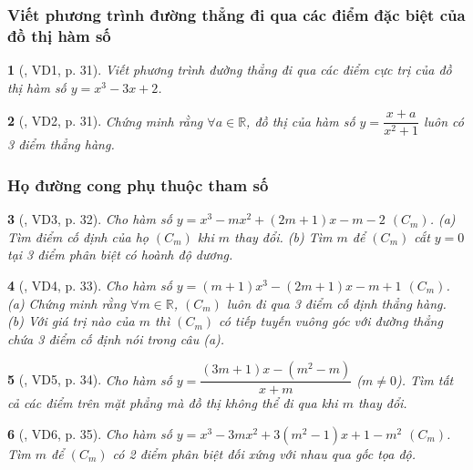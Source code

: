 \documentclass{article}
\newtheorem{baitoan}{}
\begin{document}
\subsubsection{Viết phương trình đường thẳng đi qua các điểm đặc biệt của đồ thị hàm số}

\begin{baitoan}[\cite{TLCT_giai_tich_12}, VD1, p. 31]
	Viết phương trình đường thẳng đi qua các điểm cực trị của đồ thị hàm số $y = x^3 - 3x + 2$.
\end{baitoan}

\begin{baitoan}[\cite{TLCT_giai_tich_12}, VD2, p. 31]
	Chứng minh rằng $\forall a\in\mathbb{R}$, đồ thị của hàm số $y = \dfrac{x + a}{x^2 + 1}$ luôn có 3 điểm thẳng hàng.
\end{baitoan}

\subsubsection{Họ đường cong phụ thuộc tham số}

\begin{baitoan}[\cite{TLCT_giai_tich_12}, VD3, p. 32]
	Cho hàm số $y = x^3 - mx^2 + (2m + 1)x - m - 2$ $(C_m)$. (a) Tìm điểm cố định của họ $(C_m)$ khi $m$ thay đổi. (b) Tìm $m$ để $(C_m)$ cắt $y = 0$ tại 3 điểm phân biệt có hoành độ dương.	
\end{baitoan}

\begin{baitoan}[\cite{TLCT_giai_tich_12}, VD4, p. 33]
	Cho hàm số $y = (m + 1)x^3 - (2m + 1)x - m + 1$ $(C_m)$. (a) Chứng minh rằng $\forall m\in\mathbb{R}$, $(C_m)$ luôn đi qua 3 điểm cố định thẳng hàng. (b) Với giá trị nào của $m$ thì $(C_m)$ có tiếp tuyến vuông góc với đường thẳng chứa 3 điểm cố định nói trong câu (a).	
\end{baitoan}

\begin{baitoan}[\cite{TLCT_giai_tich_12}, VD5, p. 34]
	Cho hàm số $y = \dfrac{(3m + 1)x - (m^2 - m)}{x + m}$ ($m\ne 0$). Tìm tất cả các điểm trên mặt phẳng mà đồ thị không thể đi qua khi $m$ thay đổi.
\end{baitoan}

\begin{baitoan}[\cite{TLCT_giai_tich_12}, VD6, p. 35]
	Cho hàm số $y = x^3 - 3mx^2 + 3(m^2 - 1)x + 1 - m^2$ $(C_m)$. Tìm $m$ để $(C_m)$ có 2 điểm phân biệt đối xứng với nhau qua gốc tọa độ.
\end{baitoan}
\end{document}

